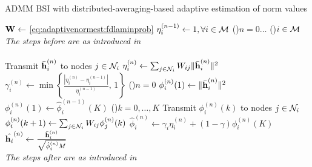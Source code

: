 \documentclass{article}
\begin{document}
\begin{algorithm}[t]
    \caption{ADMM BSI with distributed-averaging-based adaptive estimation of norm values}\label{alg:davg_norm_est}
    \(\bm{\mathrm{W}} \gets\) \eqref{eq:adaptivenormest:fdlaminprob}\;
    \(\eta_i^{(n-1)} \gets 1, \forall i \in \mathcal{M}\)\;
    \For(){\(n=0\dots\)}
    {
        \For(){\(i \in \mathcal{M}\)}
        {
            \emph{The steps before are as introduced in }\cite{blochbergerDBSI}\\
            \dotfill\\
            Transmit \(\bar{\bm{\mathrm{h}}}_i^{(n)}\) to nodes  \(j \in \mathcal{N}_i\)\;
            \(\eta_i^{(n)} \gets \sum_{j \in \mathcal{N}_i} W_{ij} \|\bar{\bm{\mathrm{h}}}_i^{(n)}\|^2\)\;
            \(\gamma_i^{(n)} \gets \min \left\lbrace \frac{| \eta_i^{(n)} - \eta_i^{(n-1)} |}{\eta_i^{(n-1)}},\,1\right\rbrace\)\;
            \eIf(){\(n = 0\)}
            {
                \(\phi_i^{(n)}(1) \gets \|\bar{\bm{\mathrm{h}}}_i^{(n)}\|^2\)\;
            }
            {
                \(\phi_i^{(n)}(1) \gets \hat{\phi}_i^{(n-1)}(K)\)\;
            }
            \For(){\(k=0,\dots,K\)}
            {
                Transmit \(\phi_i^{(n)}(k)\) to nodes  \(j \in \mathcal{N}_i\)\;
                \(\phi_i^{(n)}({k+1}) \gets \sum_{j \in \mathcal{N}_i} W_{ij} \phi_j^{(n)}({k})\)\;
            }
            \(\hat{\phi}_i^{(n)} \gets \gamma_i \eta_i^{(n)} + (1-\gamma) \phi_i^{(n)}(K)\)\;
            \(\hat{\bm{\mathrm{h}}_i}^{(n)} \gets \frac{\bar{\bm{\mathrm{h}}}_i^{(n)}}{\sqrt{\hat{\phi}_i^{(n)}M}}\)\;
            \dotfill\\
            \emph{The steps after are as introduced in }\cite{blochbergerDBSI}\\
        }
    }
\end{algorithm}

\vfill\pagebreak



\end{document}
